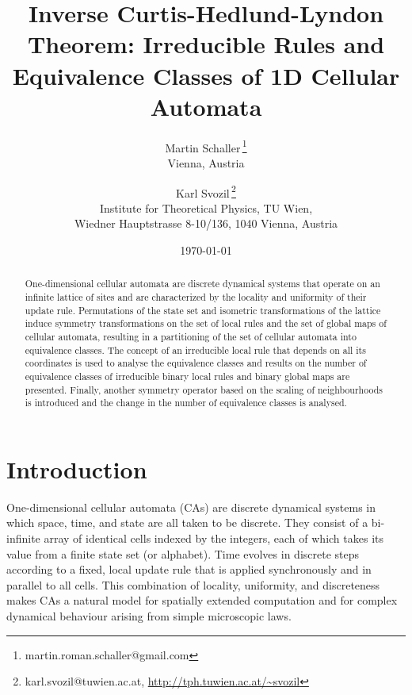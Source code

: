 \documentclass[a4paper]{article}
\begin{document}
\title{Inverse Curtis-Hedlund-Lyndon Theorem: Irreducible Rules and Equivalence Classes of 1D Cellular Automata}

\author{
    Martin Schaller\,\thanks{martin.roman.schaller@gmail.com} \\
    \small{Vienna, Austria}
    \and
    Karl Svozil\,\thanks{karl.svozil@tuwien.ac.at, \url{http://tph.tuwien.ac.at/~svozil}} \\
    \small{Institute for Theoretical Physics, TU Wien,} \\
    \small{Wiedner Hauptstrasse 8-10/136, 1040 Vienna, Austria}
}

\date{\today}
\maketitle

\begin{abstract}
One-dimensional cellular automata are discrete dynamical systems that operate on an infinite lattice of sites and
are characterized by the locality
and uniformity of their update rule.
Permutations of the state set and isometric transformations of the lattice induce symmetry transformations
on the set of local rules and the set of global maps of cellular automata, resulting
in a partitioning of the set of cellular automata into equivalence classes.
The concept of an irreducible local rule that depends on all
its coordinates is used to analyse the equivalence classes and
results on the number of equivalence classes of irreducible binary local rules and binary global maps are presented.
Finally, another symmetry operator based on the scaling of neighbourhoods is introduced and
the change in the number of equivalence classes is analysed.
\end{abstract}

\section{Introduction}

One-dimensional cellular automata (CAs) are discrete dynamical systems in which
space, time, and state are all taken to be discrete. They consist of a bi-infinite
array of identical cells indexed by the integers, each of which takes its value from
a finite state set (or alphabet). Time evolves in discrete steps according to a fixed,
local update rule that is applied synchronously and in parallel to all cells. This
combination of locality, uniformity, and discreteness makes CAs a natural model
for spatially extended computation and for complex dynamical behaviour arising
from simple microscopic laws.
\end{document}
